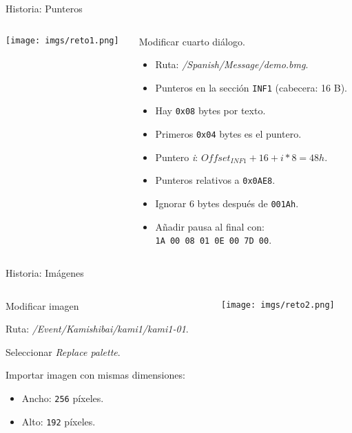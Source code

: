 \begin{frame}{Historia: Punteros}
    \begin{columns}
    \begin{column}{0.3\textwidth}
        \texttt{[image: imgs/reto1.png]}
    \end{column}
    \begin{column}{0.7\textwidth}
        Modificar cuarto diálogo.
        \footnotesize
        \begin{itemize}
            \item Ruta: \textit{/Spanish/Message/demo.bmg}.
            \item Punteros en la sección \texttt{INF1} (cabecera: 16 B).
            \item Hay \texttt{0x08} bytes por texto.
            \item Primeros \texttt{0x04} bytes es el puntero.
            \item Puntero \textit{i}: $Offset_{INF1} + 16 + i*8=48h$.
            \item Punteros relativos a \texttt{0x0AE8}.
            \item Ignorar 6 bytes después de \texttt{001Ah}.
            \item Añadir pausa al final con: \\
                  \texttt{1A 00 08 01 0E 00 7D 00}.
        \end{itemize}
    \end{column}
    \end{columns}
\end{frame}

\begin{frame}{Historia: Imágenes}
    \begin{columns}
    \begin{column}{0.7\textwidth}
        Modificar imagen
        \footnotesize
        \begin{wideitemize}
            \item Ruta: \textit{/Event/Kamishibai/kami1/kami1-01}.
            \item Seleccionar \textit{Replace palette}.
            \item Importar imagen con mismas dimensiones:
            \begin{itemize}
                \item Ancho: \texttt{256} píxeles.
                \item Alto: \texttt{192} píxeles.
            \end{itemize}
        \end{wideitemize}
    \end{column}
    \begin{column}{0.3\textwidth}
        \texttt{[image: imgs/reto2.png]}
    \end{column}
    \end{columns}
\end{frame}

